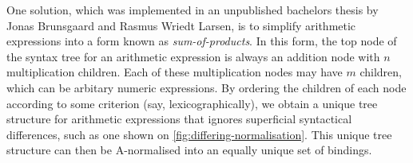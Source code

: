 One solution, which was implemented in an unpublished bachelors thesis
by Jonas Brunsgaard and Rasmus Wriedt Larsen, is to simplify
arithmetic expressions into a form known as \textit{sum-of-products}.
In this form, the top node of the syntax tree for an arithmetic
expression is always an addition node with $n$ multiplication
children.  Each of these multiplication nodes may have $m$ children,
which can be arbitary numeric expressions.  By ordering the children
of each node according to some criterion (say, lexicographically), we
obtain a unique tree structure for arithmetic expressions that ignores
superficial syntactical differences, such as one shown on
\cref{fig:differing-normalisation}.  This unique tree structure can
then be A-normalised into an equally unique set of bindings.

